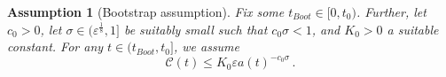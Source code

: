 \documentclass[11pt,leqno,textwidth=10cm]{amsart}
\numberwithin{equation}{section}
\theoremstyle{definition}
\theoremstyle{plain}
\newtheorem{assumption}[definition]{Assumption}
\newcommand{\1}{\mathbbm{1}}
\newcommand{\E}{\mathcal{E}}
\newcommand{\Ric}{\text{\normalfont{Ric}}}
\renewcommand{\epsilon}{\varepsilon}
\newcommand{\todo}[1]{\textcolor{red}{#1}}
\newcommand{\delete}[1]{}
\begin{document}
\begin{assumption}[Bootstrap assumption]\label{ass:bootstrap}
Fix some $t_{Boot}\in[0,t_0)$. Further, let $c_0>0$, let $\sigma\in(\epsilon^\frac18,1]$ be suitably small such that $c_0\sigma<1$, and $K_0>0$ a suitable constant. For any $t\in(t_{Boot},t_0]$, we assume 
\begin{equation}\label{eq:BsC}
\mathcal{C}(t)\leq K_0\epsilon a(t)^{-c_0\sigma}\,.
\end{equation}
\delete{as well as the energy inequalities [...]}
\end{assumption}
\end{document}
